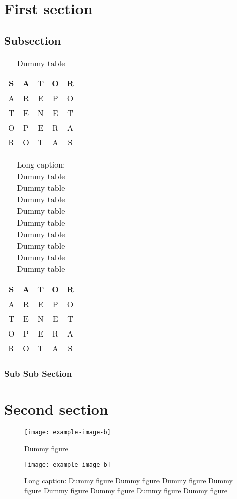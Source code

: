 \section{First section}

\lipsum[2-4]

\subsection{Subsection}
\lipsum[1-3]

\begin{table}
	\caption{Dummy table}
	\centering
	\begin{tabular}{ c c c c c } \toprule
        S & A & T & O & R\\ \midrule
        A & R & E & P & O\\ 
        T & E & N & E & T\\ 
        O & P & E & R & A\\ 
        R & O & T & A & S\\ \bottomrule
    \end{tabular}
\end{table}

\begin{table}
	\caption{Long caption: Dummy table Dummy table Dummy table Dummy table Dummy table Dummy table Dummy table Dummy table Dummy table}
	\centering
	\begin{tabular}{ c c c c c } \toprule
        S & A & T & O & R\\ \midrule
        A & R & E & P & O\\ 
        T & E & N & E & T\\ 
        O & P & E & R & A\\ 
        R & O & T & A & S\\ \bottomrule
    \end{tabular}
\end{table}

\subsubsection{Sub Sub Section}

\lipsum[1-2]


\section{Second section}

\lipsum[2-7]

\begin{figure}
\noindent\texttt{[image: example-image-b]} 
\centering
\caption{Dummy figure}
\end{figure}


\begin{figure}
\noindent\texttt{[image: example-image-b]} 
\centering
\caption{Long caption: Dummy figure Dummy figure Dummy figure Dummy figure Dummy figure Dummy figure Dummy figure Dummy figure }
\end{figure}

